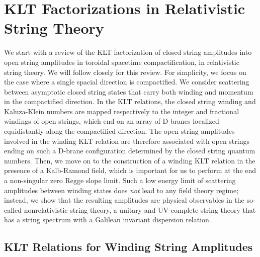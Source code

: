 \documentclass[11pt]{article}
\begin{document}
\section{KLT Factorizations in Relativistic String Theory} \label{sec:kltfwsdb}

We start with a review of the KLT factorization of closed string amplitudes into open string amplitudes in toroidal spacetime compactification, in relativistic string theory. We will follow closely \cite{Gomis:2021ire} for this review. For simplicity, we focus on the case where a single spacial direction is compactified. We consider scattering between asymptotic closed string states that carry both winding and momentum in the compactified direction. In the KLT relations, the closed string winding and Kaluza-Klein numbers are mapped respectively to the integer and fractional windings of open strings, which end on an array of D-branes localized equidistantly along the compactified direction. The open string amplitudes involved in the winding KLT relation are therefore associated with open strings ending on such a D-brane configuration determined by the closed string quantum numbers. Then, we move on to the construction of a winding KLT relation in the presence of a Kalb-Ramond field, which is important for us to perform at the end a non-singular zero Regge slope limit. Such a low energy limit of scattering amplitudes between winding states does \emph{not} lead to any field theory regime; instead, we show  that the resulting amplitudes are physical observables in the so-called nonrelativistic string theory, a unitary and UV-complete string theory that has a string spectrum with a Galilean invariant dispersion relation.    

\subsection{KLT Relations for Winding String Amplitudes} \label{sec:rklt}
\end{document}
